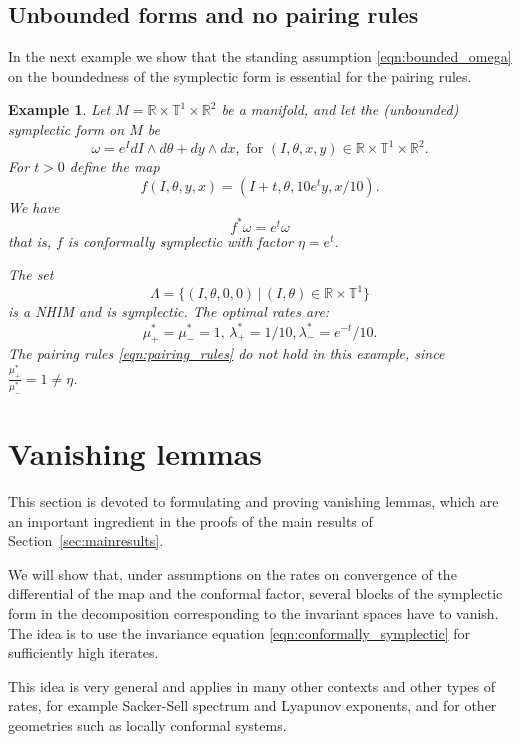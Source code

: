 \documentclass[11pt]{amsart}
\newtheorem{ex}[thm]{Example}
\theoremstyle{definition}
\theoremstyle{remark}
\numberwithin{equation}{section}
\newcommand{\T}{\mathbb T}
\def\real{{\mathbb R}}
\begin{document}
\subsection{Unbounded forms and no pairing rules}

In the next example we show that the standing assumption \eqref{eqn:bounded_omega} on the boundedness of the symplectic form is essential for the pairing rules. %



\begin{ex}\label{ex:unbounded_symplectic_form}
Let $M= \real  \times \T^1 \times\real ^2$ be a manifold, and let the (unbounded) symplectic form on $M$ be
\[\omega =  e^I  dI \wedge d \theta + dy \wedge dx, \textrm{ for } (I,\theta,x,y)\in  \real  \times \T^1 \times\real ^2.\]
For  $t>0$ define the map
\[ f(I, \theta, y,x) =    \left(I +t, \theta,  10 e^t y, x/10\right).\]
We have \[f^* \omega = e^t \omega\]
that is, $f$ is conformally symplectic with factor $\eta=e^t$.

The set \[\Lambda=\{ (I, \theta, 0, 0)\,|\, ( I,\theta) \in  \real  \times \T^1\}\]
is a NHIM and is symplectic.
The optimal rates are:
\[\mu_+^* = \mu_-^* = 1,\,\lambda_+^* = 1/10, \lambda_-^*  = e^{-t} /10.\]
The pairing rules \eqref{eqn:pairing_rules} do not hold in this example, since
$\frac{\mu_+^*}{\mu_-^*}=1\neq \eta$.
\end{ex}




\section{Vanishing lemmas}
\label{sec:vanishing_lemmas}
This section is devoted to formulating and proving vanishing lemmas, which
are an important ingredient in the proofs of the main results of Section~\ref{sec:mainresults}.

We will show that, under  assumptions on the rates on convergence of the differential of the map and
the conformal factor, several blocks of the symplectic form
in the decomposition corresponding to the invariant spaces have to vanish.
The idea is to use the invariance equation \eqref{eqn:conformally_symplectic} for
sufficiently high iterates.


This idea is very general and applies in many other contexts   and other types  of rates,
for example Sacker-Sell spectrum and Lyapunov exponents,  and for other geometries such as
locally conformal systems.
\end{document}
